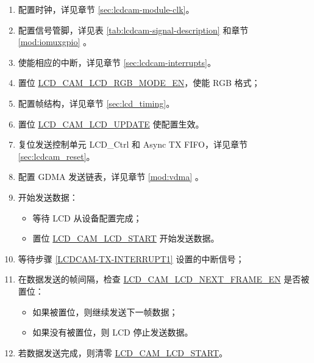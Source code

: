 \documentclass[main\_\_CN.tex]{subfiles}
\begin{document}
\begin{enumerate}
    \item 配置时钟，详见章节 \ref{sec:lcdcam-module-clk}。
    \item 配置信号管脚，详见表 \ref{tab:lcdcam-signal-description} 和章节 \ref{mod:iomuxgpio} \textit{}。

    \item \label{LCDCAM-TX-INTERRUPT1} 使能相应的中断，详见章节 \ref{sec:lcdcam-interrupts}。

    \item 置位 \hyperref[fielddesc:LCDCAMLCDRGBMODEEN]{LCD\_CAM\_LCD\_RGB\_MODE\_EN}，使能 RGB 格式；

    \item 配置帧结构，详见章节 \ref{sec:lcd_timing}。

    \item 置位 \hyperref[fielddesc:LCDCAMLCDUPDATE]{LCD\_CAM\_LCD\_UPDATE} 使配置生效。

    \item 复位发送控制单元 LCD\_Ctrl 和 Async TX FIFO，详见章节 \ref{sec:lcdcam_reset}。

    \item 配置 GDMA 发送链表，详见章节 \ref{mod:vdma} \textit{}。

    \item 开始发送数据：
    \begin{itemize}
        \item 等待 LCD 从设备配置完成；
        \item 置位 \hyperref[fielddesc:LCDCAMLCDSTART]{LCD\_CAM\_LCD\_START} 开始发送数据。
    \end{itemize}

    \item 等待步骤 \ref{LCDCAM-TX-INTERRUPT1} 设置的中断信号；

    \item 在数据发送的帧间隔，检查 \hyperref[fielddesc:LCDCAMLCDNEXTFRAMEEN]{LCD\_CAM\_LCD\_NEXT\_FRAME\_EN} 是否被置位：
        \begin{itemize}
        \item 如果被置位，则继续发送下一帧数据；
        \item 如果没有被置位，则 LCD 停止发送数据。
        \end{itemize}

    \item 若数据发送完成，则清零 \hyperref[fielddesc:LCDCAMLCDSTART]{LCD\_CAM\_LCD\_START}。
\end{enumerate}
\end{document}

